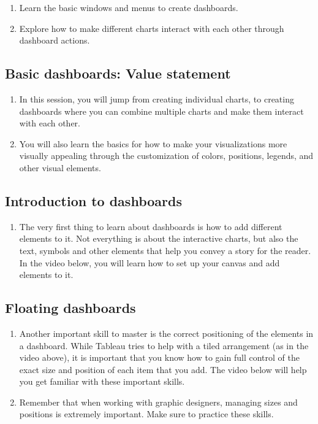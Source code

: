 \documentclass[
]{book}
\providecommand{\tightlist}{%
  \setlength{\itemsep}{0pt}\setlength{\parskip}{0pt}}
\begin{document}
\begin{enumerate}
\def\labelenumi{\arabic{enumi}.}
\tightlist
\item
  Learn the basic windows and menus to create dashboards.
\item
  Explore how to make different charts interact with each other through dashboard actions.
\end{enumerate}

\hypertarget{basic-dashboards-value-statement}{%
\subsection{Basic dashboards: Value statement}\label{basic-dashboards-value-statement}}

\begin{enumerate}
\def\labelenumi{\arabic{enumi}.}
\tightlist
\item
  In this session, you will jump from creating individual charts, to creating dashboards where you can combine multiple charts and make them interact with each other.
\item
  You will also learn the basics for how to make your visualizations more visually appealing through the customization of colors, positions, legends, and other visual elements.
\end{enumerate}

\hypertarget{introduction-to-dashboards}{%
\subsection{Introduction to dashboards}\label{introduction-to-dashboards}}

\begin{enumerate}
\def\labelenumi{\arabic{enumi}.}
\tightlist
\item
  The very first thing to learn about dashboards is how to add different elements to it. Not everything is about the interactive charts, but also the text, symbols and other elements that help you convey a story for the reader. In the video below, you will learn how to set up your canvas and add elements to it.
\end{enumerate}

\hypertarget{floating-dashboards}{%
\subsection{Floating dashboards}\label{floating-dashboards}}

\begin{enumerate}
\def\labelenumi{\arabic{enumi}.}
\tightlist
\item
  Another important skill to master is the correct positioning of the elements in a dashboard. While Tableau tries to help with a tiled arrangement (as in the video above), it is important that you know how to gain full control of the exact size and position of each item that you add. The video below will help you get familiar with these important skills.
\item
  Remember that when working with graphic designers, managing sizes and positions is extremely important. Make sure to practice these skills.
\end{enumerate}
\end{document}
